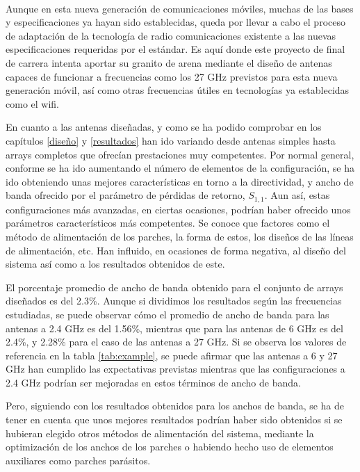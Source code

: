 \\
\par Aunque en esta nueva generación de comunicaciones móviles, muchas de las bases y especificaciones ya hayan sido establecidas, queda por llevar a cabo el proceso de adaptación de la tecnología de radio comunicaciones existente a las nuevas especificaciones requeridas por el estándar. Es aquí donde este proyecto de final de carrera intenta aportar su granito de arena mediante el diseño de antenas capaces de funcionar a frecuencias como los 27 GHz previstos para esta nueva generación móvil, así como otras frecuencias útiles en tecnologías ya establecidas como el \gls{wifi}.
\\
\par En cuanto a las antenas diseñadas, y como se ha podido comprobar en los capítulos \ref{diseño} y \ref{resultados} han ido variando desde antenas simples hasta arrays completos que ofrecían prestaciones muy competentes. Por normal general, conforme se ha ido aumentando el número de elementos de la configuración, se ha ido obteniendo unas mejores características en torno a la directividad, y ancho de banda ofrecido por el parámetro de pérdidas de retorno, $S_{1,1}$. Aun así, estas configuraciones más avanzadas, en ciertas ocasiones, podrían haber ofrecido unos parámetros característicos más competentes. Se conoce que factores como el método de alimentación de los parches, la forma de estos, los diseños de las líneas de alimentación, etc. Han influido, en ocasiones de forma negativa, al diseño del sistema así como a los resultados obtenidos de este.
\\
\par El porcentaje promedio de ancho de banda obtenido para el conjunto de arrays diseñados es del 2.3\%. Aunque si dividimos los resultados según las frecuencias estudiadas, se puede observar cómo el promedio de ancho de banda para las antenas a 2.4 GHz es del 1.56\%, mientras que para las antenas de 6 GHz es del 2.4\%, y 2.28\% para el caso de las antenas a 27 GHz. Si se observa los valores de referencia en la tabla \ref{tab:example}, se puede afirmar que las antenas a 6 y 27 GHz han cumplido las expectativas previstas mientras que las configuraciones a 2.4 GHz podrían ser mejoradas en estos términos de ancho de banda. 
\\
\par Pero, siguiendo con los resultados obtenidos para los anchos de banda, se ha de tener en cuenta que unos mejores resultados podrían haber sido obtenidos si se hubieran elegido otros métodos de alimentación del sistema, mediante la optimización de los anchos de los parches o habiendo hecho uso de elementos auxiliares como parches parásitos. 
